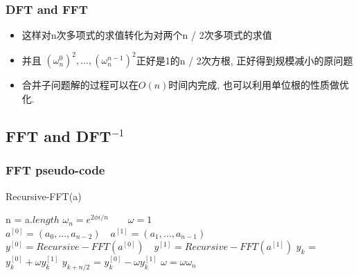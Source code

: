 \documentclass[cjk]{beamer}
\begin{document}
\begin{CJK*}{UTF8}{gbsn}
    \begin{frame}
      \frametitle{DFT and FFT}
      \begin{itemize}
        \item 这样对n次多项式的求值转化为对两个n / 2次多项式的求值
        \item 并且 $(\omega^0_n)^2, ..., (\omega^{n - 1}_n)^2$正好是1的n / 2次方根, 正好得到规模减小的原问题
        \item 合并子问题解的过程可以在$O(n)$时间内完成, 也可以利用单位根的性质做优化.
      \end{itemize}
    \end{frame}
  \subsection{FFT and DFT$^{-1}$}
    \begin{frame}
      \frametitle{FFT pseudo-code}
          \begin{algorithm}[H]
            \caption{Recursive-FFT(a)}
            \begin{algorithmic}[1]
              \State n = a.$length$
               
              \EndIf
              \State $\omega_n = e^{2\phi i / n} \quad \quad \omega = 1$
              \State $a^{[0]} = (a_0, ..., a_{n - 2}) \quad a^{[1]} = (a_1, ..., a_{n - 1})$
              \State $y^{[0]} = Recursive-FFT(a^{[0]}) \quad y^{[1]} = Recursive-FFT(a^{[1]})$
                \State $y_k$ = $y^{[0]}_k + \omega y^{[1]}_k$
                \State $y_{k + n / 2}$ = $y^{[0]}_k - \omega y^{[1]}_k$
                \State $\omega = \omega \omega_n$
              \EndFor
              \State {}
            \end{algorithmic}
          \end{algorithm}
    \end{frame}


\end{CJK*}
\end{document}
